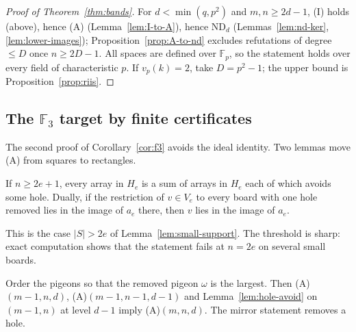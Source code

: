 \begin{proof}[Proof of Theorem~\ref{thm:bands}]
For $d<\min(q,p^2)$ and $m,n\ge2d-1$, (I) holds (above), hence (A)
(Lemma~\ref{lem:I-to-A}), hence $\mathrm{ND}_d$ (Lemmas~\ref{lem:nd-ker},
\ref{lem:lower-images}); Proposition~\ref{prop:A-to-nd} excludes refutations of degree
$\le D$ once $n\ge2D-1$.  All spaces are defined over $\mathbb F_p$, so the statement holds
over every field of characteristic $p$.  If $v_p(k)=2$, take $D=p^2-1$; the upper bound is
Proposition~\ref{prop:riis}.
\end{proof}

\subsection{The \texorpdfstring{$\mathbb F_3$}{F3} target by finite certificates}\label{sec:bands-f3}

The second proof of Corollary~\ref{cor:f3} avoids the ideal identity.  Two lemmas move (A)
from squares to rectangles.

\begin{lemma}\label{lem:hole-avoid}
If $n\ge2e+1$, every array in $H_e$ is a sum of arrays in $H_e$ each of which avoids some
hole.  Dually, if the restriction of $v\in V_e$ to every board with one hole removed lies in
the image of $a_e$ there, then $v$ lies in the image of $a_e$.
\end{lemma}

This is the case $|S|>2e$ of Lemma~\ref{lem:small-support}.  The threshold is sharp: exact
computation shows that the statement fails at $n=2e$ on several small boards.

\begin{lemma}\label{lem:pigeon-ind}
Order the pigeons so that the removed pigeon $\omega$ is the largest.  Then
(A)$(m-1,n,d)$, (A)$(m-1,n-1,d-1)$ and Lemma~\ref{lem:hole-avoid} on $(m-1,n)$ at level $d-1$
imply (A)$(m,n,d)$.  The mirror statement removes a hole.
\end{lemma}

